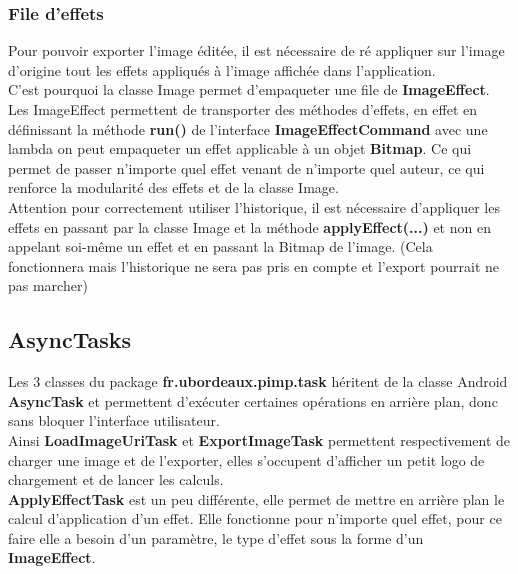 \subsubsection{File d'effets} \label{file_effets}
Pour pouvoir exporter l'image éditée, il est nécessaire de ré appliquer sur l'image d'origine tout les effets appliqués à l'image affichée dans l'application.
\\
C'est pourquoi la classe Image permet d'empaqueter une file de \textbf{ImageEffect}. Les ImageEffect permettent de transporter des méthodes d'effets, en effet en définissant la méthode \textbf{run()} de l'interface \textbf{ImageEffectCommand} avec une lambda on peut empaqueter un effet applicable à un objet \textbf{Bitmap}. Ce qui permet de passer n'importe quel effet venant de n'importe quel auteur, ce qui renforce la modularité des effets et de la classe Image.
\\
Attention pour correctement utiliser l'historique, il est nécessaire d'appliquer les effets en passant par la classe Image et la méthode \textbf{applyEffect(...)} et non en appelant soi-même un effet et en passant la Bitmap de l'image. (Cela fonctionnera mais l'historique ne sera pas pris en compte et l'export pourrait ne pas marcher)


\subsection{AsyncTasks}
Les 3 classes du package \textbf{fr.ubordeaux.pimp.task} héritent de la classe Android \textbf{AsyncTask} et permettent d'exécuter certaines opérations en arrière plan, donc sans bloquer l'interface utilisateur.
\\
Ainsi \textbf{LoadImageUriTask} et \textbf{ExportImageTask} permettent respectivement de charger une image et de l'exporter, elles s'occupent d'afficher un petit logo de chargement et de lancer les calculs.
\\
\textbf{ApplyEffectTask} est un peu différente, elle permet de mettre en arrière plan le calcul d'application d'un effet. Elle fonctionne pour n'importe quel effet, pour ce faire elle a besoin d'un paramètre, le type d'effet sous la forme d'un \textbf{ImageEffect}.


